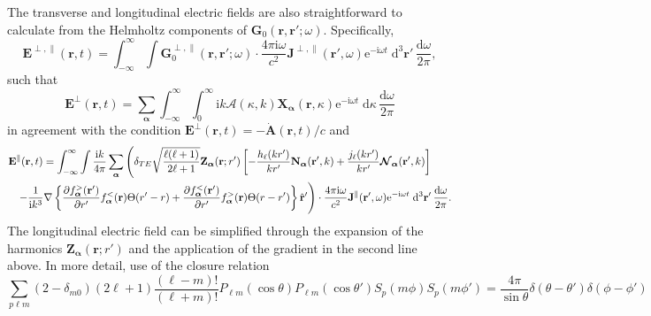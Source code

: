 \documentclass{article}
\begin{document}
The transverse and longitudinal electric fields are also straightforward to calculate from the Helmholtz components of $\mathbf{G}_0(\mathbf{r},\mathbf{r}';\omega)$. Specifically, 
\begin{equation}
\mathbf{E}^{\perp,\parallel}(\mathbf{r},t) = \int_{-\infty}^\infty\int\mathbf{G}_0^{\perp,\parallel}(\mathbf{r},\mathbf{r}';\omega)\cdot\frac{4\pi\mathrm{i}\omega}{c^2}\mathbf{J}^{\perp,\parallel}(\mathbf{r}',\omega)\mathrm{e}^{-\mathrm{i}\omega t}\;\mathrm{d}^3\mathbf{r}'\,\frac{\mathrm{d}\omega}{2\pi},
\end{equation}
such that
\begin{equation}
\mathbf{E}^\perp(\mathbf{r},t) = \sum_{\bm{\alpha}}\int_{-\infty}^\infty\int_0^\infty\mathrm{i}k\mathcal{A}(\kappa,k)\mathbf{X}_{\bm{\alpha}}(\mathbf{r},\kappa)\mathrm{e}^{-\mathrm{i}\omega t}\;\mathrm{d}\kappa\,\frac{\mathrm{d}\omega}{2\pi}
\end{equation}
in agreement with the condition $\mathbf{E}^\perp(\mathbf{r},t) = -\dot{\mathbf{A}}(\mathbf{r},t)/c$ and
\begin{equation}\label{eq:Elongitudinal1}
\begin{split}
\mathbf{E}&^\parallel(\mathbf{r},t) = \int_{-\infty}^\infty\int\frac{\mathrm{i}k}{4\pi}\sum_{\bm{\alpha}}\left(\delta_{TE}\sqrt{\frac{\ell(\ell + 1)}{2\ell + 1}}\mathbf{Z}_{\bm{\alpha}}(\mathbf{r};r')\left[-\frac{h_\ell(kr')}{kr'}\mathbf{N}_{\bm{\alpha}}(\mathbf{r}',k) + \frac{j_\ell(kr')}{kr'}\bm{\mathcal{N}}_{\bm{\alpha}}(\mathbf{r}',k)\right]\right.\\
&\left.-\frac{1}{\mathrm{i} k^3}\nabla\left\{\frac{\partial f_{\bm{\alpha}}^>(\mathbf{r}')}{\partial r'}f_{\bm{\alpha}}^<(\mathbf{r})\Theta(r' - r) + \frac{\partial f_{\bm{\alpha}}^<(\mathbf{r}')}{\partial r'}f_{\bm{\alpha}}^>(\mathbf{r})\Theta(r - r')\right\}\hat{\mathbf{r}}' \vphantom{\sqrt{\frac{\ell(\ell + 1)}{2\ell + 1}}} \right) \cdot\frac{4\pi\mathrm{i}\omega}{c^2}\mathbf{J}^\parallel(\mathbf{r}',\omega)\mathrm{e}^{-\mathrm{i}\omega t}\;\mathrm{d}^3\mathbf{r}'\,\frac{\mathrm{d}\omega}{2\pi}.
\end{split}
\end{equation}
The longitudinal electric field can be simplified through the expansion of the harmonics $\mathbf{Z}_{\bm{\alpha}}(\mathbf{r};r')$ and the application of the gradient in the second line above. In more detail, use of the closure relation
\begin{equation}
\sum_{p\ell m}(2 - \delta_{m0})(2\ell + 1)\frac{(\ell - m)!}{(\ell + m)!}P_{\ell m}(\cos\theta)P_{\ell m}(\cos\theta')S_p(m\phi)S_p(m\phi') = \frac{4\pi}{\sin\theta}\delta(\theta - \theta')\delta(\phi - \phi')
\end{equation}
\end{document}
